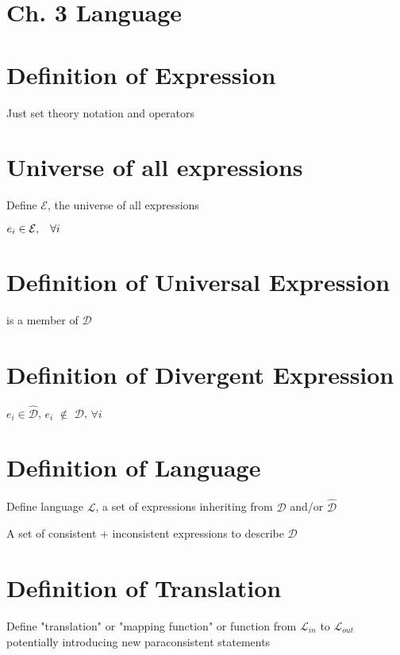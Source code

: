 \documentclass[11pt]{article}
\begin{document}
\section*{Ch. 3 Language}

\section{Definition of Expression}
Just set theory notation and operators




\section{Universe of all expressions}
Define $\mathcal{E}$, the universe of all expressions
\begin{center}
$
e_i \in \mathcal{E}, \hspace{3mm} \forall i
$
\end{center}








\section{Definition of Universal Expression}
is a member of $\mathcal{D}$





\section{Definition of Divergent Expression}
$e_i \in \hat{\mathcal{D}}$, $e_i$ $\not \in$ $\mathcal{D}$, $\forall i$








\section{Definition of Language}
Define language $\mathcal{L}$, a set of expressions inheriting from $\mathcal{D}$ and/or $\hat{\mathcal{D}}$

A set of consistent + inconsistent expressions to describe $\mathcal{D}$







\section{Definition of Translation}
Define "translation" or "mapping function" or function from $\mathcal{L}_{in}$ to ${\mathcal{L}_{out}}$\\
potentially introducing new paraconsistent statements
\end{document}
